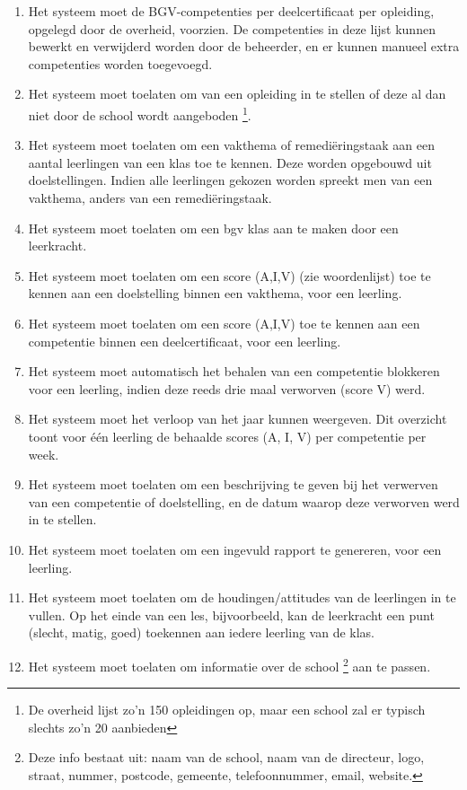 \documentclass[a4paper]{article}
\begin{document}
\begin{enumerate}[label=F\arabic*]
\item Het systeem moet de BGV-competenties per deelcertificaat per opleiding, opgelegd door de overheid, voorzien. De competenties in deze lijst kunnen bewerkt en verwijderd worden door de beheerder, en er kunnen manueel extra competenties worden toegevoegd.
\item Het systeem moet toelaten om van een opleiding in te stellen of deze al dan niet door de school wordt aangeboden \footnote{De overheid lijst zo'n 150 opleidingen op, maar een school zal er typisch slechts zo'n 20 aanbieden}.
\item Het systeem moet toelaten om een vakthema of remediëringstaak aan een aantal leerlingen van een klas toe te kennen. Deze worden opgebouwd uit doelstellingen. Indien alle leerlingen gekozen worden spreekt men van een vakthema, anders van een remediëringstaak.
\item Het systeem moet toelaten om een bgv klas aan te maken door een leerkracht.
\item Het systeem moet toelaten om een score (A,I,V) (zie woordenlijst) toe te kennen aan een doelstelling binnen een vakthema, voor een leerling.  %
\item Het systeem moet toelaten om een score (A,I,V) toe te kennen aan een competentie binnen een deelcertificaat, voor een leerling.  %
\item Het systeem moet automatisch het behalen van een competentie blokkeren voor een leerling, indien deze reeds drie maal verworven (score V) werd.  %
\item Het systeem moet het verloop van het jaar kunnen weergeven. Dit overzicht toont voor één leerling de behaalde scores (A, I, V) per competentie per week.
\item Het systeem moet toelaten om een beschrijving te geven bij het verwerven van een competentie of doelstelling, en de datum waarop deze verworven werd in te stellen.
\item Het systeem moet toelaten om een ingevuld rapport te genereren, voor een leerling.
\item Het systeem moet toelaten om de houdingen/attitudes van de leerlingen in te vullen. Op het einde van een les, bijvoorbeeld, kan de leerkracht een punt (slecht, matig, goed) toekennen aan iedere leerling van de klas.
\item Het systeem moet toelaten om informatie over de school \footnote{Deze info bestaat uit: naam van de school, naam van de directeur, logo, straat, nummer, postcode, gemeente, telefoonnummer, email, website.} aan te passen.

\end{enumerate}
\end{document}
